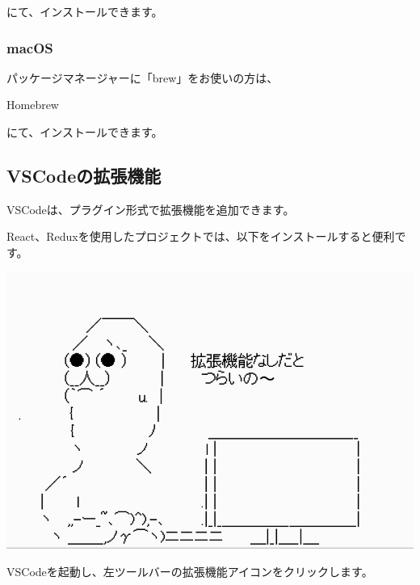 にて、インストールできます。

\subsubsection*{macOS}
\keeplastskip{
  \label{sec:1-2-1-2}
  \par\nobreak
}

パッケージマネージャーに「brew」をお使いの方は、

\def\startercodeblockfontsize{}
\begin{starterterminal}[]{Homebrew}\end{starterterminal}

にて、インストールできます。

\subsection{VSCodeの拡張機能}
\keeplastskip{
  \label{sec:1-2-2}
  \par\nobreak
}

VSCodeは、プラグイン形式で拡張機能を追加できます。

React、Reduxを使用したプロジェクトでは、以下をインストールすると便利です。

\begin{reviewimage}%
\includegraphics[width=0.5\maxwidth]{./images/01-createDevEnv/extensions.png}%
\label{image:01-createDevEnv:extensions}
\end{reviewimage}

VSCodeを起動し、左ツールバーの拡張機能アイコンをクリックします。

